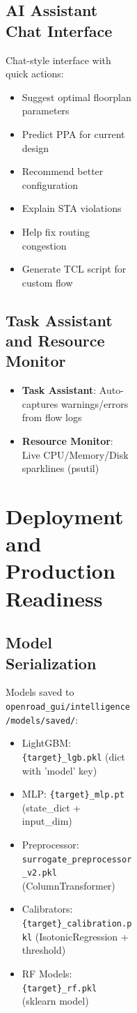 \documentclass[10pt,conference]{IEEEtran}
\begin{document}
\begin{figure}[t]
\begin{figure}[t]
\begin{figure}[t]
\begin{subfigure}{0.48\linewidth}
\subsection{AI Assistant Chat Interface}

Chat-style interface with quick actions:
\begin{itemize}
    \item Suggest optimal floorplan parameters
    \item Predict PPA for current design
    \item Recommend better configuration
    \item Explain STA violations
    \item Help fix routing congestion
    \item Generate TCL script for custom flow
\end{itemize}

\subsection{Task Assistant and Resource Monitor}

\begin{itemize}
    \item \textbf{Task Assistant}: Auto-captures warnings/errors from flow logs
    \item \textbf{Resource Monitor}: Live CPU/Memory/Disk sparklines (psutil)
\end{itemize}


\section{Deployment and Production Readiness}
\label{sec:deployment}

\subsection{Model Serialization}

Models saved to \texttt{openroad\_gui/intelligence/models/saved/}:
\begin{itemize}
    \item LightGBM: \texttt{\{target\}\_lgb.pkl} (dict with 'model' key)
    \item MLP: \texttt{\{target\}\_mlp.pt} (state\_dict + input\_dim)
    \item Preprocessor: \texttt{surrogate\_preprocessor\_v2.pkl} (ColumnTransformer)
    \item Calibrators: \texttt{\{target\}\_calibration.pkl} (IsotonicRegression + threshold)
    \item RF Models: \texttt{\{target\}\_rf.pkl} (sklearn model)
\end{itemize}


\end{subfigure}
\end{figure}
\end{figure}
\end{figure}
\end{document}
